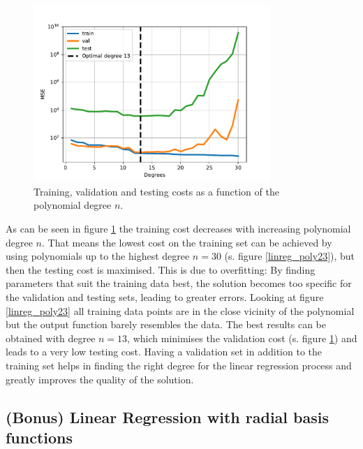 \documentclass{article}
\begin{document}
\begin{figure}[!ht]
\centering
\includegraphics[width=0.8\textwidth]{./Figures/linreg_poly4_errors.pdf}
\caption{Training, validation and testing costs as a function of the polynomial degree $n$.}
\label{linreg_poly4}
\end{figure}

As can be seen in figure \ref{linreg_poly4} the training cost decreases with increasing polynomial degree $n$. That means the lowest cost on the training set can be achieved by using polynomials up to the highest degree $n=30$ (s. figure \ref{linreg_poly23}), but then the testing cost is maximised. This is due to overfitting: By finding parameters that suit the training data best, the solution becomes too specific for the validation and testing sets, leading to greater errors. Looking at figure \ref{linreg_poly23} all training data points are in the close vicinity of the polynomial but the output function barely resembles the data. The best results can be obtained with degree $n=13$, which minimises the validation cost (s. figure \ref{linreg_poly4}) and leads to a very low testing cost. Having a validation set in addition to the training set helps in finding the right degree for the linear regression process and greatly improves the quality of the solution.

\newpage

\subsection{(Bonus) Linear Regression with radial basis functions}
\end{document}

